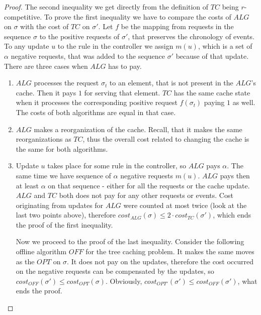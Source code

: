 \begin{proof} The second inequality we get directly from the definition of $TC$
being $r$-competitive. To prove the first inequality we have to compare the
costs of $ALG$ on $\sigma$ with the cost of $TC$ on $\sigma'$. Let $f$ be the
mapping from requests in the sequence $\sigma$ to the positive requests of
$\sigma'$, that preserves the chronology of events. To any update $u$ to the
rule in the controller we assign $m(u)$, which is a set of $\alpha$ negative
requests, that was added to the sequence $\sigma'$ because of that update. There
are three cases when $ALG$ has to pay.  \begin{enumerate} \item $ALG$ processes
the request $\sigma_t$ to an element, that is not present in the $ALG$'s cache.
Then it pays $1$ for serving that element. $TC$ has the same cache state when it
processes the corresponding positive request $f(\sigma_t)$ paying $1$ as well.
The costs of both algorithms are equal in that case.  \item $ALG$ makes a
reorganization of the cache. Recall, that it makes the same reorganizations as
$TC$, thus the overall cost related to changing the cache is the same for both
algorithms.  \item Update $u$ takes place for some rule in the controller, so
$ALG$ pays $\alpha$.  The same time we have sequence of $\alpha$ negative
requests $m(u)$. $ALG$ pays then at least $\alpha$ on that sequence - either for
all the requests or the cache update.  $ALG$ and $TC$ both does not pay for any
other requests or events. Cost originating from updates for $ALG$ were counted
at most twice (look at the last two points above), therefore $cost_{ALG}(\sigma)
\leq 2 \cdot cost_{TC}(\sigma')$, which ends the proof of the first inequality.

Now we proceed to the proof of the last inequality. Consider the following
offline algorithm $OFF$ for the tree caching problem. It makes the same moves as
the $OPT$ on $\sigma$. It does not pay on the updates, therefore the cost
occurred on the negative requests can be compensated by the updates, so
$cost_{OFF}(\sigma') \leq cost_{OPT}(\sigma)$. Obviously, $cost_{OPT'}(\sigma')
\leq cost_{OFF}(\sigma')$, what ends the proof.  \end{enumerate} \end{proof}

